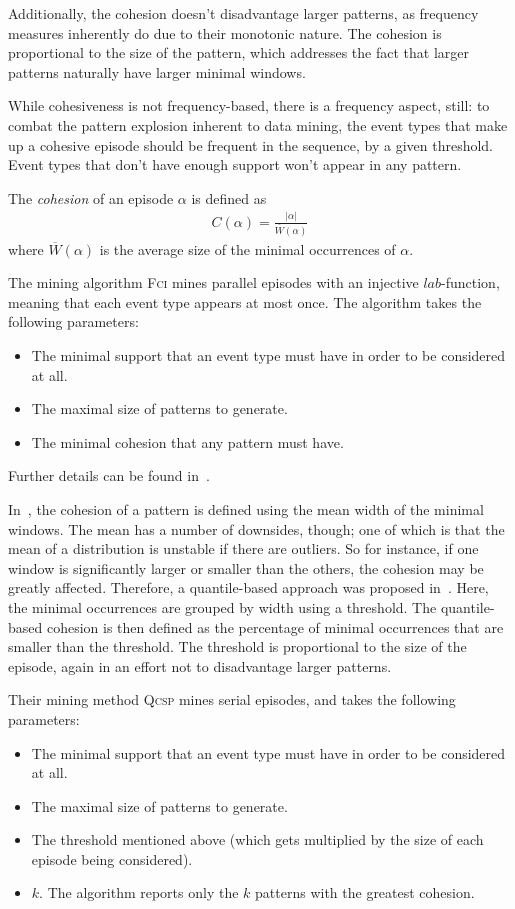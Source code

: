 Additionally, the cohesion doesn't disadvantage larger patterns, as frequency measures inherently do due to their monotonic nature. The cohesion is proportional to the size of the pattern, which addresses the fact that larger patterns naturally have larger minimal windows.

While cohesiveness is not frequency-based, there is a frequency aspect, still: to combat the pattern explosion inherent to data mining, the event types that make up a cohesive episode should be frequent in the sequence, by a given threshold. Event types that don't have enough support won't appear in any pattern.

The \emph{cohesion} of an episode $ \alpha $ is defined as
\begin{align*}
C(\alpha) = \frac{| \alpha |}{\overline{W}(\alpha)}
\end{align*}
where $ \overline{W}(\alpha) $ is the average size of the minimal occurrences of $ \alpha $.

The mining algorithm \textsc{Fci} mines parallel episodes with an injective $ lab $-function, meaning that each event type appears at most once. The algorithm takes the following parameters:
\begin{itemize}
\item The minimal support that an event type must have in order to be considered at all.
\item The maximal size of patterns to generate.
\item The minimal cohesion that any pattern must have.
\end{itemize}
Further details can be found in~\cite{cule2016efficient}.

In~\cite{cule2016efficient}, the cohesion of a pattern is defined using the mean width of the minimal windows. The mean has a number of downsides, though; one of which is that the mean of a distribution is unstable if there are outliers. So for instance, if one window is significantly larger or smaller than the others, the cohesion may be greatly affected. Therefore, a quantile-based approach was proposed in~\citep{feremans2018mining}. Here, the minimal occurrences are grouped by width using a threshold. The quantile-based cohesion is then defined as the percentage of minimal occurrences that are smaller than the threshold. The threshold is proportional to the size of the episode, again in an effort not to disadvantage larger patterns.

Their mining method \textsc{Qcsp} mines serial episodes, and takes the following parameters:
\begin{itemize}
\item The minimal support that an event type must have in order to be considered at all.
\item The maximal size of patterns to generate.
\item The threshold mentioned above (which gets multiplied by the size of each episode being considered).
\item $ k $. The algorithm reports only the $ k $ patterns with the greatest cohesion.
\end{itemize}

